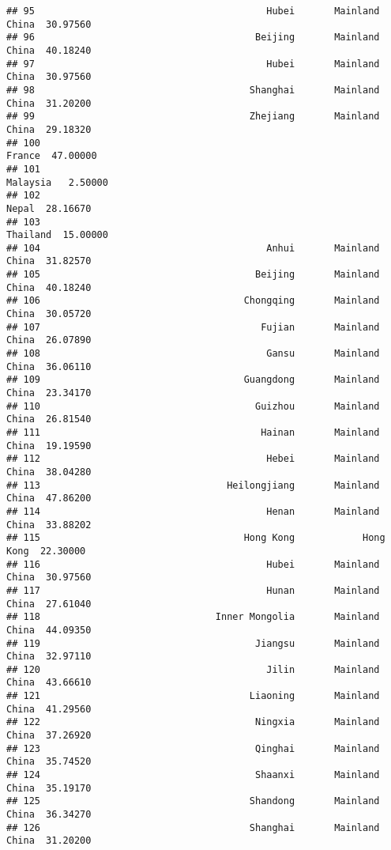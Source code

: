 \documentclass[
]{article}
\begin{document}
\begin{verbatim}
## 95                                         Hubei       Mainland China  30.97560
## 96                                       Beijing       Mainland China  40.18240
## 97                                         Hubei       Mainland China  30.97560
## 98                                      Shanghai       Mainland China  31.20200
## 99                                      Zhejiang       Mainland China  29.18320
## 100                                                            France  47.00000
## 101                                                          Malaysia   2.50000
## 102                                                             Nepal  28.16670
## 103                                                          Thailand  15.00000
## 104                                        Anhui       Mainland China  31.82570
## 105                                      Beijing       Mainland China  40.18240
## 106                                    Chongqing       Mainland China  30.05720
## 107                                       Fujian       Mainland China  26.07890
## 108                                        Gansu       Mainland China  36.06110
## 109                                    Guangdong       Mainland China  23.34170
## 110                                      Guizhou       Mainland China  26.81540
## 111                                       Hainan       Mainland China  19.19590
## 112                                        Hebei       Mainland China  38.04280
## 113                                 Heilongjiang       Mainland China  47.86200
## 114                                        Henan       Mainland China  33.88202
## 115                                    Hong Kong            Hong Kong  22.30000
## 116                                        Hubei       Mainland China  30.97560
## 117                                        Hunan       Mainland China  27.61040
## 118                               Inner Mongolia       Mainland China  44.09350
## 119                                      Jiangsu       Mainland China  32.97110
## 120                                        Jilin       Mainland China  43.66610
## 121                                     Liaoning       Mainland China  41.29560
## 122                                      Ningxia       Mainland China  37.26920
## 123                                      Qinghai       Mainland China  35.74520
## 124                                      Shaanxi       Mainland China  35.19170
## 125                                     Shandong       Mainland China  36.34270
## 126                                     Shanghai       Mainland China  31.20200

\end{verbatim}
\end{document}
